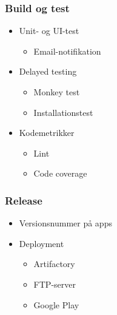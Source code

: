 \begin{frame}
    \frametitle{Build og test}
\begin{itemize}
  \item Unit- og UI-test
    \begin{itemize}
    \item Email-notifikation
    \end{itemize}
  \item Delayed testing
    \begin{itemize}
    \item Monkey test
    \item Installationstest
    \end{itemize}
  \item Kodemetrikker
    \begin{itemize}
    \item Lint
    \item Code coverage
    \end{itemize}
  \end{itemize}
\end{frame}

\begin{frame}
    \frametitle{Release}
    \begin{itemize}
    \item Versionsnummer på apps
    \item Deployment
      \begin{itemize}
      \item Artifactory
      \item FTP-server
      \item Google Play
      \end{itemize}
    \end{itemize}
  \end{frame}
